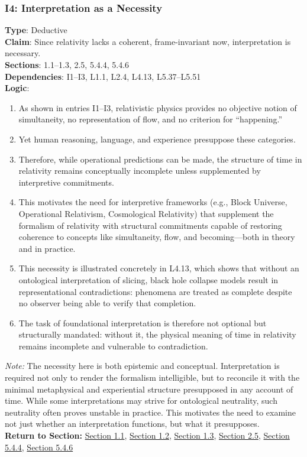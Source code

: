 \documentclass[12pt]{book}
\begin{document}
\subsubsection*{I4: Interpretation as a Necessity}
\label{appendix:I4}
\textbf{Type}: Deductive\\
\textbf{Claim}: Since relativity lacks a coherent, frame-invariant now, interpretation is necessary.\\
\textbf{Sections}: 1.1–1.3, 2.5, 5.4.4, 5.4.6\\
\textbf{Dependencies}: I1–I3, L1.1, L2.4, L4.13, L5.37–L5.51\\
\textbf{Logic}:
\begin{enumerate}
    \item As shown in entries I1–I3, relativistic physics provides no objective notion of simultaneity, no representation of flow, and no criterion for ``happening.''
    \item Yet human reasoning, language, and experience presuppose these categories.
    \item Therefore, while operational predictions can be made, the structure of time in relativity remains conceptually incomplete unless supplemented by interpretive commitments.
    \item This motivates the need for interpretive frameworks (e.g., Block Universe, Operational Relativism, Cosmological Relativity) that supplement the formalism of relativity with structural commitments capable of restoring coherence to concepts like simultaneity, flow, and becoming---both in theory and in practice.
    \item This necessity is illustrated concretely in L4.13, which shows that without an ontological interpretation of slicing, black hole collapse models result in representational contradictions: phenomena are treated as complete despite no observer being able to verify that completion.
    \item The task of foundational interpretation is therefore not optional but structurally mandated: without it, the physical meaning of time in relativity remains incomplete and vulnerable to contradiction.
\end{enumerate}
\textit{Note:} The necessity here is both epistemic and conceptual. Interpretation is required not only to render the formalism intelligible, but to reconcile it with the minimal metaphysical and experiential structure presupposed in any account of time. While some interpretations may strive for ontological neutrality, such neutrality often proves unstable in practice. This motivates the need to examine not just whether an interpretation functions, but what it presupposes.\\
\textbf{Return to Section:} \hyperref[sec:1.1]{Section 1.1}, \hyperref[sec:1.2]{Section 1.2}, \hyperref[sec:1.3]{Section 1.3}, \hyperref[sec:2.5]{Section 2.5}, \hyperref[sec:5.4.4]{Section 5.4.4}, \hyperref[sec:5.4.6]{Section 5.4.6}
\end{document}
